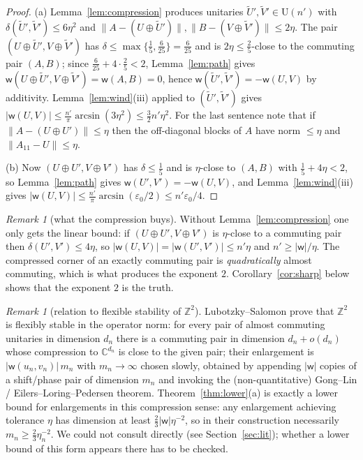 \documentclass[11pt]{amsart}
\theoremstyle{definition}
\theoremstyle{remark}
\newtheorem{remark}[theorem]{Remark}
\newcommand{\Z}{\mathbb Z}
\newcommand{\C}{\mathbb C}
\newcommand{\wind}{\mathsf w}
\newcommand{\U}{\mathrm U}
\newcommand{\norm}[1]{\lVert #1\rVert}
\begin{document}
\begin{proof}
(a) Lemma~\ref{lem:compression} produces unitaries $\tilde U',\tilde V'\in\U(n')$ with $\delta(\tilde U',\tilde V')\le6\eta^2$ and $\norm{A-(U\oplus\tilde U')},\norm{B-(V\oplus\tilde V')}\le2\eta$. The pair $(U\oplus\tilde U',V\oplus\tilde V')$ has $\delta\le\max\{\frac15,\frac6{25}\}=\frac6{25}$ and is $2\eta\le\frac25$-close to the commuting pair $(A,B)$; since $\frac6{25}+4\cdot\frac25<2$, Lemma~\ref{lem:path} gives $\wind(U\oplus\tilde U',V\oplus\tilde V')=\wind(A,B)=0$, hence $\wind(\tilde U',\tilde V')=-\wind(U,V)$ by additivity. Lemma~\ref{lem:wind}(iii) applied to $(\tilde U',\tilde V')$ gives $|\wind(U,V)|\le\frac{n'}\pi\arcsin(3\eta^2)\le\frac32n'\eta^2$. For the last sentence note that if $\norm{A-(U\oplus U')}\le\eta$ then the off-diagonal blocks of $A$ have norm $\le\eta$ and $\norm{A_{11}-U}\le\eta$.

(b) Now $(U\oplus U',V\oplus V')$ has $\delta\le\frac15$ and is $\eta$-close to $(A,B)$ with $\frac15+4\eta<2$, so Lemma~\ref{lem:path} gives $\wind(U',V')=-\wind(U,V)$, and Lemma~\ref{lem:wind}(iii) gives $|\wind(U,V)|\le\frac{n'}{\pi}\arcsin(\varepsilon_0/2)\le n'\varepsilon_0/4$.
\end{proof}

\begin{remark}[what the compression buys]
Without Lemma~\ref{lem:compression} one only gets the linear bound: if $(U\oplus U',V\oplus V')$ is $\eta$-close to a commuting pair then $\delta(U',V')\le4\eta$, so $|\wind(U,V)|=|\wind(U',V')|\le n'\eta$ and $n'\ge|\wind|/\eta$. The compressed corner of an exactly commuting pair is \emph{quadratically} almost commuting, which is what produces the exponent $2$. Corollary~\ref{cor:sharp} below shows that the exponent $2$ is the truth.
\end{remark}

\begin{remark}[relation to flexible stability of $\Z^2$]\label{rem:LS}
Lubotzky--Salomon \cite{LS26} prove that $\Z^2$ is flexibly stable in the operator norm: for every pair of almost commuting unitaries in dimension $d_n$ there is a commuting pair in dimension $d_n+o(d_n)$ whose compression to $\C^{d_n}$ is close to the given pair; their enlargement is $|\wind(u_n,v_n)|\,m_n$ with $m_n\to\infty$ chosen slowly, obtained by appending $|\wind|$ copies of a shift/phase pair of dimension $m_n$ and invoking the (non-quantitative) Gong--Lin / Eilers--Loring--Pedersen theorem. Theorem~\ref{thm:lower}(a) is exactly a lower bound for enlargements in this compression sense: any enlargement achieving tolerance $\eta$ has dimension at least $\frac23|\wind|\eta^{-2}$, so in their construction necessarily $m_n\ge\frac23\eta_n^{-2}$. We could not consult \cite{LS26} directly (see Section~\ref{sec:lit}); whether a lower bound of this form appears there has to be checked.
\end{remark}
\end{document}
